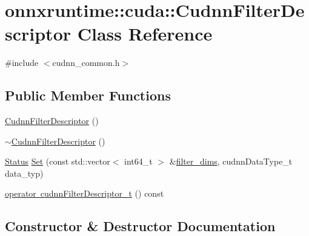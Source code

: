 \hypertarget{classonnxruntime_1_1cuda_1_1CudnnFilterDescriptor}{}\section{onnxruntime\+:\+:cuda\+:\+:Cudnn\+Filter\+Descriptor Class Reference}
\label{classonnxruntime_1_1cuda_1_1CudnnFilterDescriptor}


{\ttfamily \#include $<$cudnn\+\_\+common.\+h$>$}

\subsection*{Public Member Functions}
\begin{DoxyCompactItemize}
\item 
\mbox{\hyperlink{classonnxruntime_1_1cuda_1_1CudnnFilterDescriptor_a5267d90c0e03cc7deee6fa551123b775}{Cudnn\+Filter\+Descriptor}} ()
\item 
\mbox{\hyperlink{classonnxruntime_1_1cuda_1_1CudnnFilterDescriptor_ab58bf63b1bbea535b29939e95b123441}{$\sim$\+Cudnn\+Filter\+Descriptor}} ()
\item 
\mbox{\hyperlink{classonnxruntime_1_1common_1_1Status}{Status}} \mbox{\hyperlink{classonnxruntime_1_1cuda_1_1CudnnFilterDescriptor_a65807223db58a737e7d1fe609fbbb38c}{Set}} (const std\+::vector$<$ int64\+\_\+t $>$ \&\mbox{\hyperlink{mkldnn_2nn_2conv_8cc_ab74a7c8696a235ba976220745e5c6110}{filter\+\_\+dims}}, cudnn\+Data\+Type\+\_\+t data\+\_\+typ)
\item 
\mbox{\hyperlink{classonnxruntime_1_1cuda_1_1CudnnFilterDescriptor_a9e4ba311797f0c17da7a8cb44fda6a85}{operator cudnn\+Filter\+Descriptor\+\_\+t}} () const
\end{DoxyCompactItemize}


\subsection{Constructor \& Destructor Documentation}
\mbox{\label{classonnxruntime_1_1cuda_1_1CudnnFilterDescriptor_a5267d90c0e03cc7deee6fa551123b775}} 
